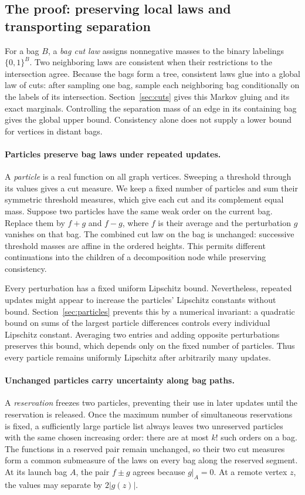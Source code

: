 \subsection{The proof: preserving local laws and transporting separation}

For a bag $B$, a \emph{bag cut law} assigns nonnegative masses to the
binary labelings $\{0,1\}^B$. Two neighboring laws are consistent
when their restrictions to the intersection agree. Because the bags
form a tree, consistent laws glue into a global law of cuts: after
sampling one bag, sample each neighboring bag conditionally on the
labels of its intersection. Section~\ref{sec:cuts} gives this
Markov gluing and its exact marginals. Controlling the separation
mass of an edge in its containing bag gives the global upper bound.
Consistency alone does not supply a lower bound for vertices in
distant bags.

\paragraph{Particles preserve bag laws under repeated updates.}
A \emph{particle} is a real function on all graph vertices. Sweeping
a threshold through its values gives a cut measure. We keep a fixed
number of particles and sum their symmetric threshold measures,
which give each cut and its complement equal mass.
Suppose two particles have the same weak order on the current bag.
Replace them by $f+g$ and $f-g$, where $f$ is their average and the
perturbation $g$ vanishes on that bag. The combined cut law on the
bag is unchanged: successive threshold masses are affine in the
ordered heights. This permits different continuations into the
children of a decomposition node while preserving consistency.

Every perturbation has a fixed uniform Lipschitz bound. Nevertheless,
repeated updates might appear to increase the particles' Lipschitz constants
without bound. Section~\ref{sec:particles} prevents this by a
numerical invariant: a quadratic bound on sums of the largest
particle differences controls every individual Lipschitz constant.
Averaging two entries and adding opposite perturbations preserves
this bound, which depends only on the fixed number of particles. Thus every
particle remains uniformly Lipschitz after arbitrarily many updates.

\paragraph{Unchanged particles carry uncertainty along bag paths.}
A \emph{reservation} freezes two particles, preventing their use in
later updates until the reservation is released. Once the maximum
number of simultaneous reservations is fixed, a sufficiently large
particle list always leaves two unreserved particles with the same
chosen increasing order: there are at most $k!$ such orders on a bag.
The functions in a reserved pair remain unchanged, so their two cut
measures form a common submeasure of the laws on every bag
along the reserved segment. At its launch bag $A$, the pair $f\pm g$
agrees because $g|_A=0$. At a remote vertex $z$, the values may
separate by $2|g(z)|$.

